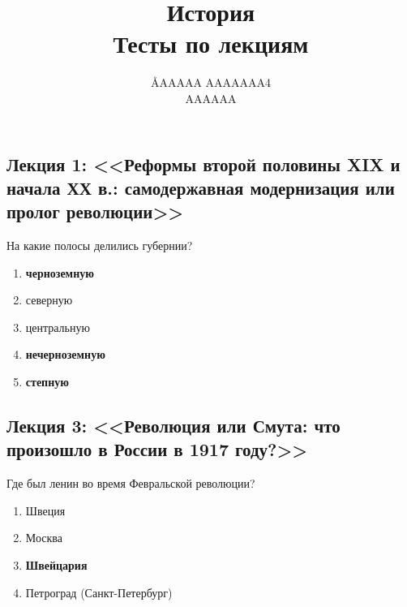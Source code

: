 \documentclass[12pt]{article}
\title{История \\ Тесты по лекциям}
\author{\AA{AAAAA AAAAAAA}{4} \\ AAAAAA}
\begin{document}
  \maketitle

  \subsection*{Лекция 1: <<Реформы второй половины XIX и начала ХХ в.: самодержавная модернизация или пролог революции>>}
  На какие полосы делились губернии?
  \begin{enumerate}
    \item \textbf{черноземную}
    \item северную
    \item центральную
    \item \textbf{нечерноземную}
    \item \textbf{степную}
  \end{enumerate}

  \subsection*{Лекция 3: <<Революция или Смута: что произошло в России в 1917 году?>>}
  Где был ленин во время Февральской революции?
  \begin{enumerate}
    \item Швеция
    \item Москва
    \item \textbf{Швейцария}
    \item Петроград (Санкт-Петербург)
  \end{enumerate}
\end{document}
